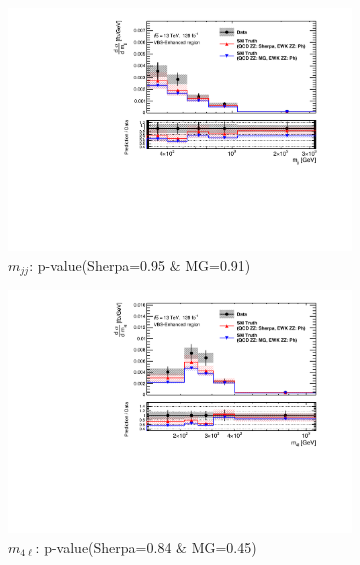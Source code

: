 \begin{figure}[!htb]
    \centering
    \begin{subfigure}{.48\textwidth}
        \centering
        \includegraphics[width=.98\linewidth]{figures/Results/CrossSection_VBSEnhanced/xs_mjj_SR.pdf}
        \caption{ \footnotesize{$m_{jj}$: p-value(Sherpa=0.95 $\&$ MG=0.91)}}
    \end{subfigure}
    \begin{subfigure}{.48\textwidth}
        \centering
        \includegraphics[width=.98\linewidth]{figures/Results/CrossSection_VBSEnhanced/xs_m4l_SR.pdf}
        \caption{ \footnotesize{$m_{4\ell}$: p-value(Sherpa=0.84 $\&$ MG=0.45)} }
    \end{subfigure}\\
    \begin{subfigure}{.48\textwidth}

\end{subfigure}
\end{figure}
